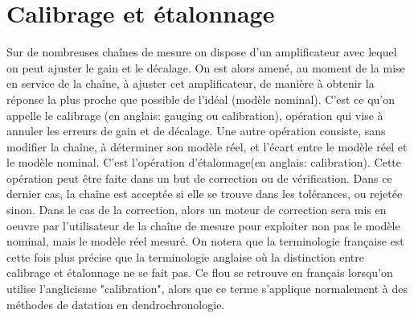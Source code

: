 \section{Calibrage et étalonnage}

Sur de nombreuses chaînes de mesure on dispose d'un amplificateur avec lequel on peut ajuster le gain et le décalage. On est alors amené, au moment de la mise en service de la chaîne, à ajuster cet amplificateur, de manière à obtenir la réponse la plus proche que possible de l'idéal (modèle nominal). C'est ce qu'on appelle le calibrage (en anglais: gauging ou calibration), opération qui vise à annuler les erreurs de gain et de décalage. Une autre opération consiste, sans modifier la chaîne, à déterminer son modèle réel, et l'écart entre le modèle réel et le modèle nominal. C'est l'opération d'étalonnage(en anglais: calibration). Cette opération peut être faite dans un but de correction ou de vérification. Dans ce dernier cas, la chaîne est acceptée si elle se trouve dans les tolérances, ou rejetée sinon. Dans le cas de la correction, alors un moteur de correction sera mis en oeuvre par l'utilisateur de la chaîne de mesure pour exploiter non pas le modèle nominal, mais le modèle réel mesuré.
On notera que la terminologie française est cette fois plus précise que la terminologie anglaise où la distinction entre calibrage et étalonnage ne se fait pas. Ce flou se retrouve en français lorsqu'on utilise l'anglicisme "calibration", alors que ce terme s'applique normalement à des méthodes de datation en dendrochronologie.
\begin{center}
\end{center}

